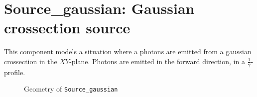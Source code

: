 \section{Source\_gaussian: Gaussian crossection source}
\label{source-flat}

This component models a situation where a photons are emitted from a gaussian crossection in the $XY$-plane. Photons are emitted in the forward direction, in a $\frac{1}{\gamma}$-profile.
\begin{figure}
\label{f:source_gaussian}
\caption{Geometry of \texttt{Source\_gaussian}}
\end{figure}
